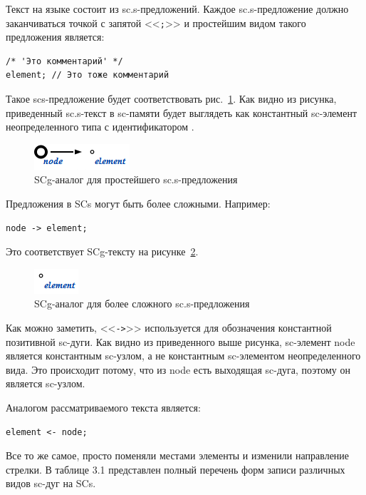 Текст на языке \SCs состоит из sc.s-предложений. Каждое
sc.s-предложение должно заканчиваться точкой с запятой <<\texttt{;}>>
и простейшим видом такого предложения является:

\begin{lstlisting}[language=SCs,texcl]
/* 'Это комментарий' */
element; // Это тоже комментарий
\end{lstlisting}

Такое scs-предложение будет соответствовать
рис.~\ref{fig:SCs_simple_sentence}. Как видно из рисунка,
приведенный sc.s-текст в sc-памяти будет выглядеть как константный
sc-элемент неопределенного типа с идентификатором .

\begin{figure}[h!]
  \centering
  \includegraphics{images/5/scs/simple_sentence}
  \caption{SCg-аналог для простейшего sc.s-предложения}
  \label{fig:SCs_simple_sentence}
\end{figure}

Предложения в SCs могут быть более сложными. Например:
\begin{verbatim}
node -> element;
\end{verbatim}

Это соответствует SCg-тексту на рисунке~\ref{fig:SCs_sentence}.

\begin{figure}[h!]
  \centering
  \includegraphics{images/5/scs/sentence}
  \caption{SCg-аналог для более сложного sc.s-предложения}
  \label{fig:SCs_sentence}
\end{figure}

Как можно заметить, <<\texttt{->}>> используется для обозначения
константной позитивной sc-дуги. Как видно из приведенного выше
рисунка, sc-элемент node является константным sc-узлом, а не
константным sc-элементом неопределенного вида. Это происходит потому,
что из node есть выходящая sc-дуга, поэтому он является sc-узлом.

Аналогом рассматриваемого текста является:
\begin{verbatim}
element <- node;
\end{verbatim}

Все то же самое, просто поменяли местами элементы и изменили
направление стрелки. В таблице 3.1 представлен полный перечень форм
записи различных видов sc-дуг на SCs.

